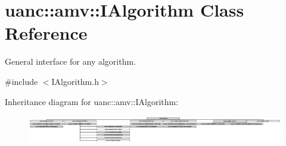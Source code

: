 \hypertarget{classuanc_1_1amv_1_1_i_algorithm}{}\section{uanc\+:\+:amv\+:\+:I\+Algorithm Class Reference}
\label{classuanc_1_1amv_1_1_i_algorithm}


General interface for any algorithm.  




{\ttfamily \#include $<$I\+Algorithm.\+h$>$}

Inheritance diagram for uanc\+:\+:amv\+:\+:I\+Algorithm\+:\begin{figure}[H]
\begin{center}
\leavevmode
\includegraphics[height=1.209213cm]{classuanc_1_1amv_1_1_i_algorithm}
\end{center}
\end{figure}
